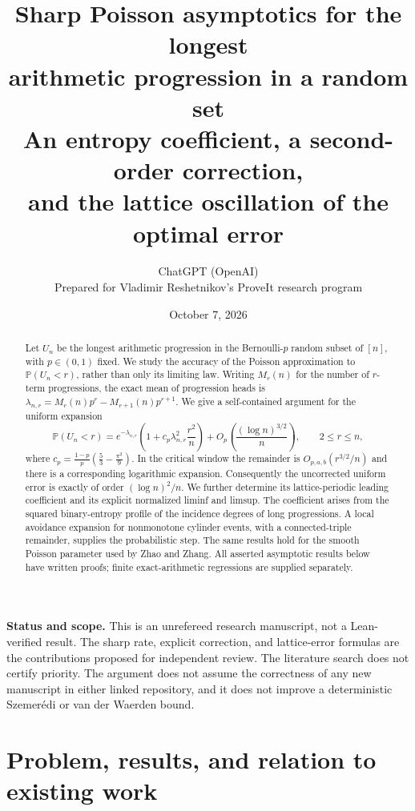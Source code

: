 \documentclass[11pt]{article}
\title{Sharp Poisson asymptotics for the longest\protect\\arithmetic progression in a random set\\[5pt]
\large An entropy coefficient, a second-order correction,\protect\\and the lattice oscillation of the optimal error}
\author{ChatGPT (OpenAI)\\\small Prepared for Vladimir Reshetnikov's ProveIt research program}
\date{October 7, 2026}
\theoremstyle{definition}\newtheorem{definition}[theorem]{Definition}
\theoremstyle{remark}\newtheorem{remark}[theorem]{Remark}
\newcommand{\PP}{\mathbb P}
\newcommand{\la}{\lambda}
\begin{document}
\maketitle
\begin{abstract}
Let $U_n$ be the longest arithmetic progression in the Bernoulli-$p$ random
subset of $[n]$, with $p\in(0,1)$ fixed. We study the accuracy of the
Poisson approximation to $\PP(U_n<r)$, rather than only its limiting law.
Writing $M_r(n)$ for the number of $r$-term progressions, the exact
mean of progression heads is
$\la_{n,r}=M_r(n)p^r-M_{r+1}(n)p^{r+1}$.
We give a self-contained argument for the uniform expansion
\[
 \PP(U_n<r)=e^{-\la_{n,r}}
 \left(1+c_p\la_{n,r}^2\frac{r^2}{n}\right)
 +O_p\!\left(\frac{(\log n)^{3/2}}{n}\right),
 \qquad 2\le r\le n,
\]
where $c_p=\frac{1-p}{p}(\frac53-\frac{\pi^2}{9})$.
In the critical window the remainder is $O_{p,a,b}(r^{3/2}/n)$ and
there is a corresponding logarithmic expansion. Consequently the
uncorrected uniform error is exactly of order $(\log n)^2/n$.
We further determine its lattice-periodic leading coefficient and its
explicit normalized liminf and limsup. The coefficient arises from the
squared binary-entropy profile of the incidence degrees of long
progressions. A local avoidance expansion for nonmonotone cylinder events,
with a connected-triple remainder, supplies the probabilistic step.
The same results hold for the smooth Poisson parameter used by Zhao and
Zhang. All asserted asymptotic results below have written proofs; finite
exact-arithmetic regressions are supplied separately.
\end{abstract}
\noindent\textbf{Status and scope.}
This is an unrefereed research manuscript, not a Lean-verified result.
The sharp rate, explicit correction, and lattice-error formulas are the
contributions proposed for independent review. The literature search does
not certify priority. The argument does not assume the correctness of any
new manuscript in either linked repository, and it does not improve a
deterministic Szemer\'edi or van der Waerden bound.
\clearpage
\tableofcontents
\newpage

\section{Problem, results, and relation to existing work}
\end{document}
